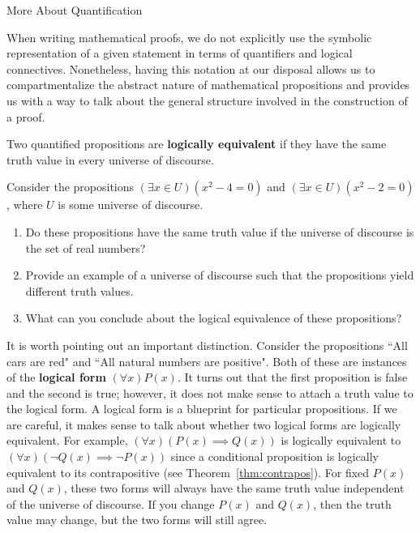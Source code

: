 \begin{section}{More About Quantification}

When writing mathematical proofs, we do not explicitly use the symbolic representation of a given statement in terms of quantifiers and logical connectives.  Nonetheless, having this notation at our disposal allows us to compartmentalize the abstract nature of mathematical propositions and provides us with a way to talk about the general structure involved in the construction of a proof.

\begin{definition}
Two quantified propositions are \textbf{logically equivalent} if they have the same truth value in every universe of discourse.
\end{definition}

\begin{problem}
Consider the propositions $(\exists x\in U)(x^2-4=0)$ and $(\exists x\in U)(x^2-2=0)$, where $U$ is some universe of discourse.  
\begin{enumerate}[label=\textrm{(\alph*)}]
\item Do these propositions have the same truth value if the universe of discourse is the set of real numbers?
\item Provide an example of a universe of discourse such that the propositions yield different truth values.  
\item What can you conclude about the logical equivalence of these propositions?
\end{enumerate}
\end{problem}

It is worth pointing out an important distinction.  Consider the propositions ``All cars are red" and ``All natural numbers are positive".  Both of these are instances of the \textbf{logical form} $(\forall x)P(x)$.  It turns out that the first proposition is false and the second is true; however, it does not make sense to attach a truth value to the logical form.  A logical form is a blueprint for particular propositions.  If we are careful, it makes sense to talk about whether two logical forms are logically equivalent.  For example, $(\forall x)(P(x)\implies Q(x))$ is logically equivalent to $(\forall x)(\neg Q(x)\implies \neg P(x))$ since a conditional proposition is logically equivalent to its contrapositive (see Theorem~\ref{thm:contrapos}).  For fixed $P(x)$ and $Q(x)$, these two forms will always have the same truth value independent of the universe of discourse.  If you change $P(x)$ and $Q(x)$, then the truth value may change, but the two forms will still agree.


\end{section}
